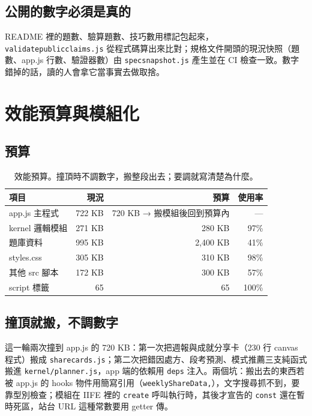 \documentclass[11pt,a4paper,oneside]{report}
\renewcommand{\_}{\ifmmode\origunderscore\else\textunderscore\allowbreak\fi}
\newcommand{\code}[1]{\texttt{#1}}
\newcommand{\file}[1]{\texttt{\small #1}}
\begin{document}
\section{公開的數字必須是真的}
README 裡的題數、驗算題數、技巧數用標記包起來，\file{validate\_public\_claims.js} 從程式碼算出來比對；規格文件開頭的現況快照（題數、app.js 行數、驗證器數）由 \file{spec\_snapshot.js} 產生並在 CI 檢查一致。數字錯掉的話，讀的人會拿它當事實去做取捨。

\chapter{效能預算與模組化}
\section{預算}
\begin{table}[h]
\centering\small\sffamily
\begin{tabular}{@{}lrrr@{}}
\toprule
項目 & 現況 & 預算 & 使用率 \\
\midrule
app.js 主程式 & 722 KB & 720 KB → 搬模組後回到預算內 & — \\
kernel 邏輯模組 & 271 KB & 280 KB & 97\% \\
題庫資料 & 995 KB & 2,400 KB & 41\% \\
styles.css & 305 KB & 310 KB & 98\% \\
其他 src 腳本 & 172 KB & 300 KB & 57\% \\
script 標籤 & 65 & 65 & 100\% \\
\bottomrule
\end{tabular}
\caption{效能預算。撞頂時不調數字，搬整段出去；要調就寫清楚為什麼。}
\end{table}

\section{撞頂就搬，不調數字}
這一輪兩次撞到 app.js 的 720 KB：第一次把週報與成就分享卡（230 行 canvas 程式）搬成 \file{share\_cards.js}；第二次把錯因處方、段考預測、模式推薦三支純函式搬進 \file{kernel/planner.js}，app 端的依賴用 \code{deps} 注入。兩個坑：搬出去的東西若被 app.js 的 hooks 物件用簡寫引用（\code{weeklyShareData,}），文字搜尋抓不到，要靠型別檢查；模組在 IIFE 裡的 \code{create} 呼叫執行時，其後才宣告的 \code{const} 還在暫時死區，站台 URL 這種常數要用 getter 傳。

\end{document}
